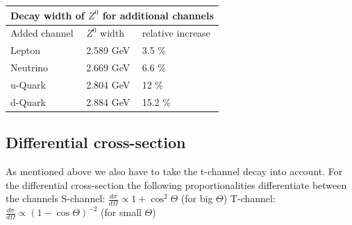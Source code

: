 \documentclass[]{article}
\begin{document}
\begin{tabular}{ |p{3cm}||p{3cm}|p{3cm}|  }
 \hline
 \multicolumn{3}{|c|}{Decay width of $Z^0$ for additional channels} \\
 \hline
 Added channel & $Z^0$ width & relative increase \\
 \hline
   Lepton & 2.589 GeV & 3.5 \%  \\
   Neutrino & 2.669  GeV & 6.6 \%  \\
   u-Quark & 2.804  GeV & 12 \%  \\
   d-Quark & 2.884 GeV & 15.2 \%  \\
  \hline
\end{tabular}

\subsection{Differential cross-section}
As mentioned above we also have to take the t-channel decay into account. For the differential cross-section the following proportionalities differentiate between the channels
\newline
S-channel: $\frac{d\sigma}{d\Omega} \propto 1 + \cos^2{\Theta}$ (for big $\Theta$)
\newline
T-channel: $\frac{d\sigma}{d\Omega} \propto (1 - \cos{\Theta})^{-2}$ (for small $\Theta$)
\end{document}
